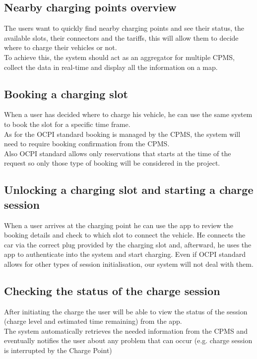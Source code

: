 \subsection{Nearby charging points overview}
The users want to quickly find nearby charging points and see their status, the available slots, their connectors and the tariffs, this will allow them to decide where to charge their vehicles or not.\\
To achieve this, the system should act as an aggregator for multiple CPMS, collect the data in real-time and display all the information on a map.

\subsection{Booking a charging slot}
When a user has decided where to charge his vehicle, he can use the same system to book the slot for a specific time frame.\\
As for the OCPI standard booking is managed by the CPMS, the system will need to require booking confirmation from the CPMS.\\
Also OCPI standard allows only reservations that starts at the time of the request so only those type of booking will be considered in the project.

\subsection{Unlocking a charging slot and starting a charge session}
When a user arrives at the charging point he can use the app to review the booking details and check to which slot to connect the vehicle. He connects the car via the correct plug provided by the charging slot and, afterward, he uses the app to authenticate into the system and start charging. Even if OCPI standard allows for other types of session initialisation, our system will not deal with them.

\subsection{Checking the status of the charge session}
After initiating the charge the user will be able to view the status of the session (charge level and estimated time remaining) from the app.\\
The system automatically retrieves the needed information from the CPMS and eventually notifies the user about any problem that can occur (e.g. charge session is interrupted by the Charge Point)

